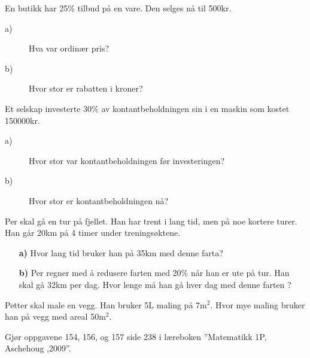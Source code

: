 \documentclass[a4, 11pt, twoside]{article}
\theoremstyle{definition}
\begin{document}
\begin{Exercise}
  En butikk har 25\% tilbud på en vare. Den selges nå til 500kr.
\begin{description}
\item[a)] Hva var ordinær pris?
\item[b)] Hvor stor er rabatten i kroner?
\end{description}
\end{Exercise}

\begin{Exercise}
  Et selskap investerte 30\% av kontantbeholdningen sin i en maskin
  som kostet 150000kr.
  \begin{description}
    \item[a)] Hvor stor var kontantbeholdningen før investeringen?
    \item[b)] Hvor stor er kontantbeholdningen nå?
  \end{description}
\end{Exercise}


\begin{Exercise}
Per skal gå en tur på fjellet. Han har trent i lang tid, men på noe
kortere turer. Han går 20km på 4 timer under treningsøktene.
\begin{itemize}
\item[\bf a)] Hvor lang tid bruker han på 35km med denne farta?
\item[\bf b)] Per regner med å redusere farten med 20\% når han er ute på
    tur. Han skal gå 32km per dag. Hvor lenge må han gå hver dag med denne
        farten ?
\end{itemize}
\end{Exercise}


\begin{Exercise}
Petter skal male en vegg. Han bruker 5L maling på 7m$^2$. Hvor mye
maling bruker han på vegg med areal 50m$^2$.
\end{Exercise}

\begin{Exercise}
Gjør oppgavene 154, 156, og 157 side 238 i læreboken ''Matematikk 1P, Aschehoug ,2009''.
\end{Exercise}
\end{document}
